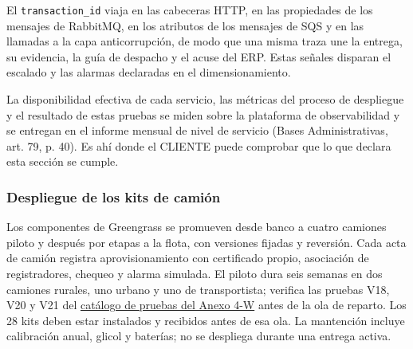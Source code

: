 El \texttt{transaction\_id} viaja en las cabeceras HTTP, en las propiedades de los mensajes de RabbitMQ, en los atributos de los mensajes de SQS y en las llamadas a la capa anticorrupción, de modo que una misma traza une la entrega, su evidencia, la guía de despacho y el acuse del ERP. Estas señales disparan el escalado y las alarmas declaradas en el dimensionamiento.

La disponibilidad efectiva de cada servicio, las métricas del proceso de despliegue y el resultado de estas pruebas se miden sobre la plataforma de observabilidad y se entregan en el informe mensual de nivel de servicio (Bases Administrativas, art. 79, p. 40). Es ahí donde el CLIENTE puede comprobar que lo que declara esta sección se cumple.

\label{fuente-11-j-despliegue-fin}

\subsubsection{Despliegue de los kits de camión}
Los componentes de Greengrass se promueven desde banco a cuatro camiones piloto y después por etapas a la flota, con versiones fijadas y reversión. Cada acta de camión registra aprovisionamiento con certificado propio, asociación de registradores, chequeo y alarma simulada. El piloto dura seis semanas en dos camiones rurales, uno urbano y uno de transportista; verifica las pruebas V18, V20 y V21 del \href{LAFROX-Subdocumento4-Anexos.pdf#tab:frio-v1-v21}{catálogo de pruebas del Anexo 4-W} antes de la ola de reparto. Los 28 kits deben estar instalados y recibidos antes de esa ola. La mantención incluye calibración anual, glicol y baterías; no se despliega durante una entrega activa.
